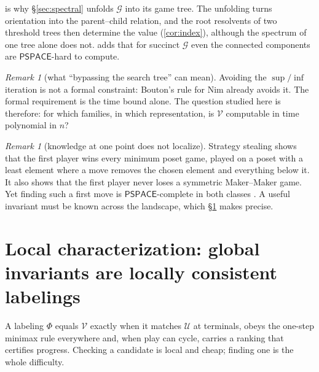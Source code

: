 \documentclass[11pt]{amsart}
\theoremstyle{plain}
\theoremstyle{definition}
\theoremstyle{remark}
\newtheorem{remark}[theorem]{Remark}
\numberwithin{equation}{section}
\newcommand{\val}{\mathcal{V}}            %
\newcommand{\pay}{\mathcal{U}}            %
\newcommand{\SG}{\mathcal{G}}             %
\newcommand{\cls}[1]{\mathsf{#1}}
\newcommand{\PSPACE}{\cls{PSPACE}}
\begin{document}
 is why \S\ref{sec:spectral} unfolds $\SG$ into its game tree. The unfolding turns orientation into the parent--child relation, and the root resolvents of two threshold trees then determine the value (\cref{cor:index}), although the spectrum of one tree alone does not.  adds that for succinct $\SG$ even the connected components are $\PSPACE$-hard to compute.

\begin{remark}[what ``bypassing the search tree'' can mean]\label{rem:bypass}
Avoiding the $\sup/\inf$ iteration is not a formal constraint: Bouton's rule for Nim already avoids it. The formal requirement is the time bound alone. The question studied here is therefore: for which families, in which representation, is $\val$ computable in time polynomial in $n$?
\end{remark}

\begin{remark}[knowledge at one point does not localize]\label{rem:strategy-stealing}
Strategy stealing shows that the first player wins every minimum poset game, played on a poset with a least element where a move removes the chosen element and everything below it. It also shows that the first player never loses a symmetric Maker--Maker game. Yet finding such a first move is $\PSPACE$-complete in both classes \cite{BodwinGrossman}. A useful invariant must be known across the landscape, which \S\ref{sec:local} makes precise.
\end{remark}

\section{Local characterization: global invariants are locally consistent labelings}\label{sec:local}

A labeling $\Phi$ equals $\val$ exactly when it matches $\pay$ at terminals, obeys the one-step minimax rule everywhere and, when play can cycle, carries a ranking that certifies progress. Checking a candidate is local and cheap; finding one is the whole difficulty.
\end{document}
